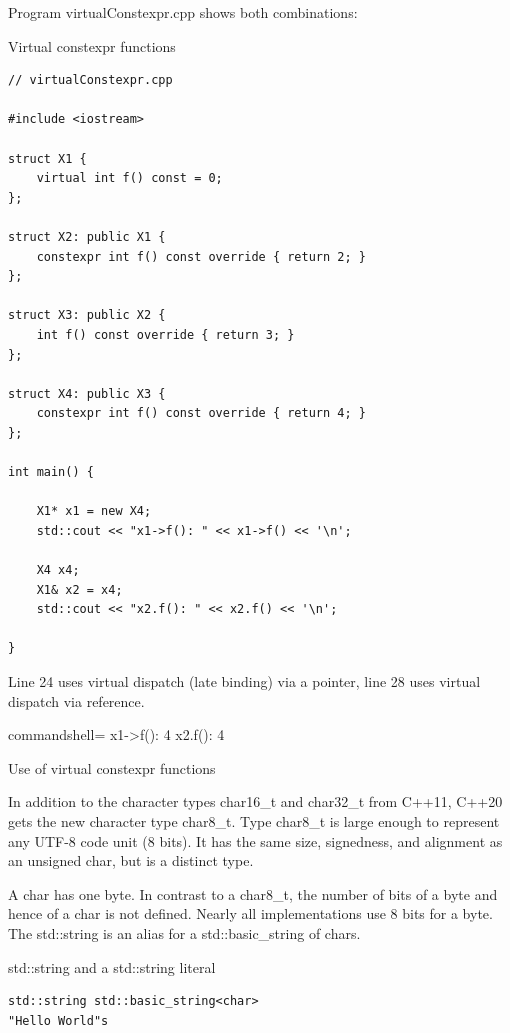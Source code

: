 Program virtualConstexpr.cpp shows both combinations:

\noindent
Virtual constexpr functions
\begin{lstlisting}[style=styleCXX]
// virtualConstexpr.cpp

#include <iostream>

struct X1 {
	virtual int f() const = 0;
};

struct X2: public X1 {
	constexpr int f() const override { return 2; }
};

struct X3: public X2 {
	int f() const override { return 3; }
};

struct X4: public X3 {
	constexpr int f() const override { return 4; }
};

int main() {
	
	X1* x1 = new X4;
	std::cout << "x1->f(): " << x1->f() << '\n';
	
	X4 x4;
	X1& x2 = x4;
	std::cout << "x2.f(): " << x2.f() << '\n';

}
\end{lstlisting}

Line 24 uses virtual dispatch (late binding) via a pointer, line 28 uses virtual dispatch via reference.

\begin{tcblisting}{commandshell={}}
x1->f(): 4
x2.f(): 4
\end{tcblisting}

\begin{center}
Use of virtual constexpr functions
\end{center}


In addition to the character types char16\_t and char32\_t from C++11, C++20 gets the new character type char8\_t. Type char8\_t is large enough to represent any UTF-8 code unit (8 bits). It has the same size, signedness, and alignment as an unsigned char, but is a distinct type.

\begin{tcolorbox}[colback=blue!5!white,colframe=blue!75!black,title={char versus char8\_t}]
A char has one byte. In contrast to a char8\_t, the number of bits of a byte and hence of a char is not defined. Nearly all implementations use 8 bits for a byte. The std::string is an alias for a std::basic\_string of chars.

\noindent
std::string and a std::string literal
\begin{lstlisting}[style=styleCXX]
std::string std::basic_string<char>
"Hello World"s
\end{lstlisting}
\end{tcolorbox}


